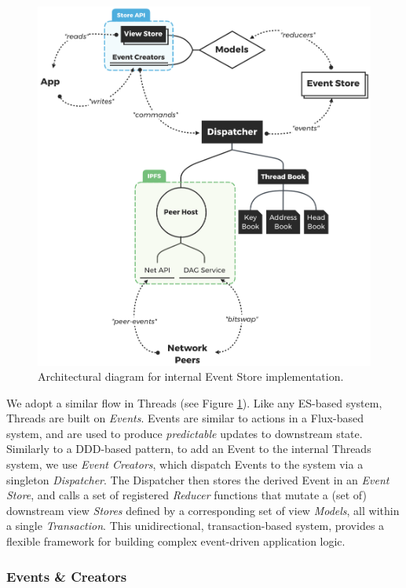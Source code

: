 \documentclass{textile}
\begin{document}
\begin{figure}
  \includegraphics[width=\linewidth]{figures/Architecture.png}
  \caption{Architectural diagram for internal Event Store implementation.}
  \label{fig:Architecture}
\end{figure}

We adopt a similar flow in Threads (see Figure \ref{fig:Architecture}). Like any ES-based system, Threads are built on \emph{Events}. Events are similar to actions in a Flux-based system, and are used to produce \emph{predictable} updates to downstream state. Similarly to a DDD-based pattern, to add an Event to the internal Threads system, we use \emph{Event Creators}, which dispatch Events to the system via a singleton \emph{Dispatcher}. The Dispatcher then stores the derived Event in an \emph{Event Store}, and calls a set of registered \emph{Reducer} functions that mutate a (set of) downstream view \emph{Stores} defined by a corresponding set of view \emph{Models}, all within a single \emph{Transaction}. This unidirectional, transaction-based system, provides a flexible framework for building complex event-driven application logic.

\subsubsection{Events \& Creators}\label{sec:creators}
\end{document}
